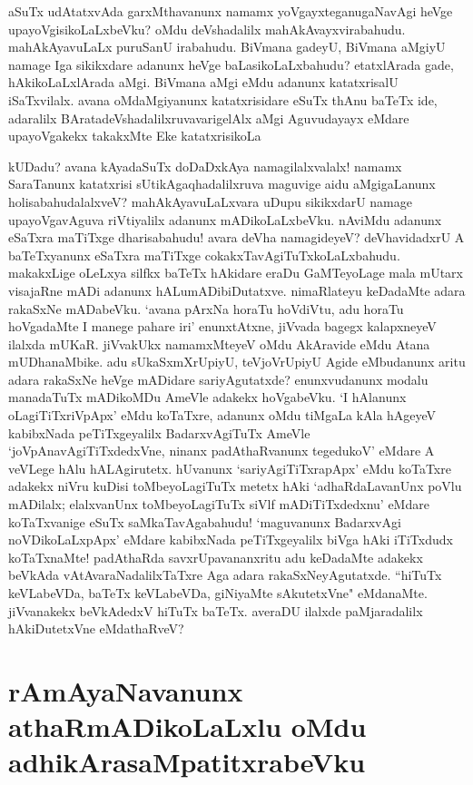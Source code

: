 aSuTx udAtatxvAda garxMthavanunx namamx yoVgayxteganugaNavAgi heVge upayoVgisikoLaLxbeVku? oMdu deVshadalilx mahAkAvayxvirabahudu. mahAkAyavuLaLx puruSanU irabahudu. BiVmana gadeyU, BiVmana aMgiyU namage Iga sikikxdare adanunx heVge baLasikoLaLxbahudu? etatxlArada gade, hAkikoLaLxlArada aMgi. BiVmana aMgi eMdu adanunx katatxrisalU iSaTxvilalx. avana oMdaMgiyanunx katatxrisidare eSuTx thAnu baTeTx ide, adaralilx BAratadeVshadalilxruvavarigelAlx aMgi Aguvudayayx eMdare upayoVgakekx takakxMte Eke katatxrisikoLa


kUDadu? avana kAyadaSuTx doDaDxkAya namagilalxvalalx! namamx SaraTanunx katatxrisi sUtikAgaqhadalilxruva maguvige aidu aMgigaLanunx holisabahudalalxveV? mahAkAyavuLaLxvara uDupu sikikxdarU namage upayoVgavAguva riVtiyalilx adanunx mADikoLaLxbeVku. nAviMdu adanunx eSaTxra maTiTxge dharisabahudu! avara deVha namagideyeV? deVhavidadxrU A baTeTxyanunx eSaTxra maTiTxge cokakxTavAgiTuTxkoLaLxbahudu. makakxLige oLeLxya silfkx baTeTx hAkidare eraDu GaMTeyoLage mala mUtarx visajaRne mADi adanunx hALumADibiDutatxve. nimaRlateyu keDadaMte adara rakaSxNe mADabeVku. `avana pArxNa horaTu hoVdiVtu, adu horaTu hoVgadaMte I manege pahare iri' enunxtAtxne, jiVvada bagegx kalapxneyeV ilalxda mUKaR. jiVvakUkx namamxMteyeV oMdu AkAravide eMdu Atana mUDhanaMbike. adu sUkaSxmXrUpiyU, teVjoVrUpiyU Agide eMbudanunx aritu adara rakaSxNe heVge mADidare sariyAgutatxde? enunxvudanunx modalu manadaTuTx mADikoMDu AmeVle adakekx hoVgabeVku. `I hAlanunx oLagiTiTxriVpApx' eMdu koTaTxre, adanunx oMdu tiMgaLa kAla hAgeyeV kabibxNada peTiTxgeyalilx BadarxvAgiTuTx AmeVle `joVpAnavAgiTiTxdedxVne, ninanx padAthaRvanunx tegedukoV' eMdare A veVLege hAlu hALAgirutetx. hUvanunx `sariyAgiTiTxrapApx' eMdu koTaTxre adakekx niVru kuDisi toMbeyoLagiTuTx metetx hAki `adhaRdaLavanUnx poVlu mADilalx; elalxvanUnx toMbeyoLagiTuTx siVlf mADiTiTxdedxnu' eMdare koTaTxvanige eSuTx saMkaTavAgabahudu! `maguvanunx BadarxvAgi noVDikoLaLxpApx' eMdare kabibxNada peTiTxgeyalilx biVga hAki iTiTxdudx koTaTxnaMte! padAthaRda savxrUpavananxritu adu keDadaMte adakekx beVkAda vAtAvaraNadalilxTaTxre Aga adara rakaSxNeyAgutatxde. ``hiTuTx keVLabeVDa, baTeTx keVLabeVDa, giNiyaMte sAkutetxVne" eMdanaMte. jiVvanakekx beVkAdedxV hiTuTx baTeTx. averaDU ilalxde paMjaradalilx hAkiDutetxVne eMdathaRveV? 


\section*{rAmAyaNavanunx athaRmADikoLaLxlu oMdu adhikArasaMpatitxrabeVku} 


